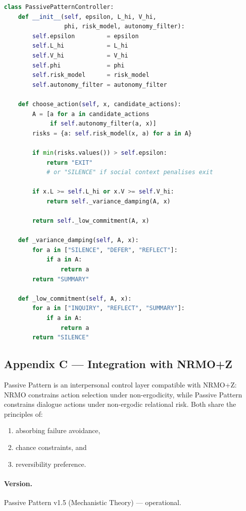 \begin{lstlisting}[basicstyle=\ttfamily\scriptsize,frame=single,language=Python]
class PassivePatternController:
    def __init__(self, epsilon, L_hi, V_hi,
                 phi, risk_model, autonomy_filter):
        self.epsilon         = epsilon
        self.L_hi            = L_hi
        self.V_hi            = V_hi
        self.phi             = phi
        self.risk_model      = risk_model
        self.autonomy_filter = autonomy_filter

    def choose_action(self, x, candidate_actions):
        A = [a for a in candidate_actions
             if self.autonomy_filter(a, x)]
        risks = {a: self.risk_model(x, a) for a in A}

        if min(risks.values()) > self.epsilon:
            return "EXIT"
            # or "SILENCE" if social context penalises exit

        if x.L >= self.L_hi or x.V >= self.V_hi:
            return self._variance_damping(A, x)

        return self._low_commitment(A, x)

    def _variance_damping(self, A, x):
        for a in ["SILENCE", "DEFER", "REFLECT"]:
            if a in A:
                return a
        return "SUMMARY"

    def _low_commitment(self, A, x):
        for a in ["INQUIRY", "REFLECT", "SUMMARY"]:
            if a in A:
                return a
        return "SILENCE"
\end{lstlisting}

\subsection*{Appendix C --- Integration with NRMO+Z}
\label{sec:pp-app-C}

Passive Pattern is an interpersonal control layer compatible with
NRMO+Z: NRMO constrains action selection under non-ergodicity,
while Passive Pattern constrains dialogue actions under non-ergodic
relational risk. Both share the principles of:

\begin{enumerate}
\item absorbing failure avoidance,
\item chance constraints, and
\item reversibility preference.
\end{enumerate}

\paragraph{Version.}
Passive Pattern v1.5 (Mechanistic Theory) --- operational.


